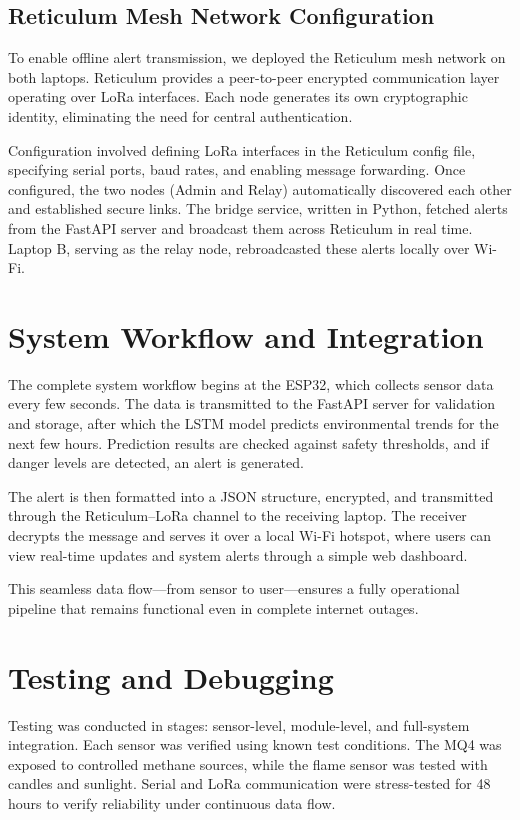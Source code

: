 \subsection{Reticulum Mesh Network Configuration}
\label{subsec:reticulum_config}

To enable offline alert transmission, we deployed the Reticulum mesh network on both laptops. Reticulum provides a peer-to-peer encrypted communication layer operating over LoRa interfaces. Each node generates its own cryptographic identity, eliminating the need for central authentication.

Configuration involved defining LoRa interfaces in the Reticulum config file, specifying serial ports, baud rates, and enabling message forwarding. Once configured, the two nodes (Admin and Relay) automatically discovered each other and established secure links. The bridge service, written in Python, fetched alerts from the FastAPI server and broadcast them across Reticulum in real time. Laptop B, serving as the relay node, rebroadcasted these alerts locally over Wi-Fi.

\section{System Workflow and Integration}
\label{sec:system_workflow}

The complete system workflow begins at the ESP32, which collects sensor data every few seconds. The data is transmitted to the FastAPI server for validation and storage, after which the LSTM model predicts environmental trends for the next few hours. Prediction results are checked against safety thresholds, and if danger levels are detected, an alert is generated.

The alert is then formatted into a JSON structure, encrypted, and transmitted through the Reticulum–LoRa channel to the receiving laptop. The receiver decrypts the message and serves it over a local Wi-Fi hotspot, where users can view real-time updates and system alerts through a simple web dashboard.

This seamless data flow—from sensor to user—ensures a fully operational pipeline that remains functional even in complete internet outages.

\section{Testing and Debugging}
\label{sec:testing}

Testing was conducted in stages: sensor-level, module-level, and full-system integration. Each sensor was verified using known test conditions. The MQ4 was exposed to controlled methane sources, while the flame sensor was tested with candles and sunlight. Serial and LoRa communication were stress-tested for 48 hours to verify reliability under continuous data flow.

